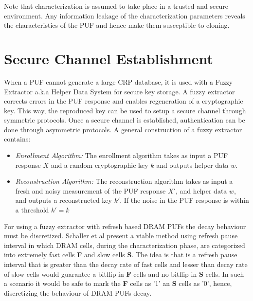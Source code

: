 \documentclass[journal, a4paper]{IEEEtran}
\begin{document}
Note that characterization is assumed to take place in a trusted and secure environment. Any information leakage of the characterization parameters reveals the characteristics of the PUF and hence make them susceptible to cloning.

\section{Secure Channel Establishment}

When a PUF cannot generate a large CRP database, it is used with a Fuzzy Extractor a.k.a Helper Data System \cite{HDS15} for secure key storage. A fuzzy extractor corrects errors in the PUF response \cite{SUT18} and enables regeneration of a cryptographic key. This way, the reproduced key can be used to setup a secure channel through symmetric protocols. Once a secure channel is established, authentication can be done through asymmetric protocols. A general construction of a fuzzy extractor contains:

\begin{itemize}
    \item \textit{Enrollment Algorithm:} The enrollment algorithm takes as input a PUF response \(X\) and a random cryptographic key \(k\) and outputs helper data \(w\).
    \item \textit{Reconstruction Algorithm:}  The reconstruction algorithm takes as input a fresh and noisy measurement of the PUF response \(X'\), and helper data \(w\), and outputs a reconstructed key \(k'\). If the noise in the PUF response is within a threshold \( k' = k\)
\end{itemize}

For using a fuzzy extractor with refresh based DRAM PUFs the decay behaviour must be discretized. Schaller et al present a viable method using refresh pause interval in which DRAM cells, during the characterization phase, are categorized into extremely fast cells \textbf{F} and slow cells \textbf{S}. The idea is that is a refresh pause interval that is greater than the decay rate of fast cells and lesser than decay rate of slow cells would guarantee a bitflip in \textbf{F} cells and no bitflip in \textbf{S} cells. In such a scenario it would be safe to mark the \textbf{F} cells as '1' an \textbf{S} cells as '0', hence, discretizing the behaviour of DRAM PUFs decay.
\end{document}
